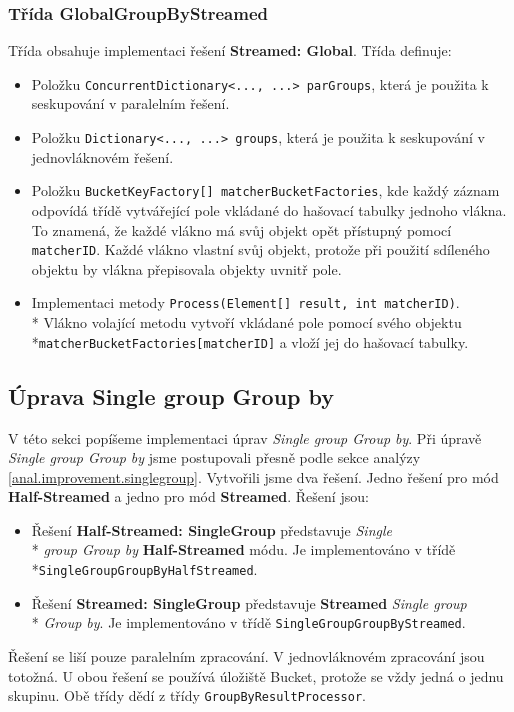 \subsubsection{Třída GlobalGroupByStreamed}

Třída obsahuje implementaci řešení \textbf{Streamed: Global}.
Třída definuje:
\begin{itemize}
\item Položku \texttt{ConcurrentDictionary<..., ...> parGroups}, která je použita k seskupování v paralelním řešení.
\item Položku \texttt{Dictionary<..., ...> groups}, která je použita k seskupování v jednovláknovém řešení.
\item Položku \texttt{BucketKeyFactory[] matcherBucketFactories}, kde každý záznam odpovídá třídě vytvářející pole vkládané do hašovací tabulky jednoho vlákna.
To znamená, že každé vlákno má svůj objekt opět přístupný pomocí \texttt{matcherID}.
Každé vlákno vlastní svůj objekt, protože při použití sdíleného objektu by vlákna přepisovala objekty uvnitř pole.
\item Implementaci metody \texttt{Process(Element[] result, int matcherID)}.\\*
Vlákno volající metodu vytvoří vkládané pole pomocí svého objektu \\*\texttt{matcherBucketFactories[matcherID]} a vloží jej do hašovací tabulky.
\end{itemize}

\subsection{Úprava Single group Group by}

V této sekci popíšeme implementaci úprav \textit{Single group Group by}.
Při úpravě \textit{Single group Group by} jsme postupovali přesně podle sekce analýzy \ref{anal.improvement.singlegroup}.
Vytvořili jsme dva řešení.
Jedno řešení pro mód \textbf{Half-Streamed} a jedno pro mód \textbf{Streamed}.
Řešení jsou:
\begin{itemize}
\item Řešení \textbf{Half-Streamed: SingleGroup} představuje \textit{Single}\\* \textit{group Group by} \textbf{Half-Streamed} módu.
Je implementováno v třídě \\*\texttt{SingleGroupGroupByHalfStreamed}.
\item Řešení \textbf{Streamed: SingleGroup} představuje \textbf{Streamed} \textit{Single group}\\* \textit{Group by}.
Je implementováno v třídě \texttt{SingleGroupGroupByStreamed}.
\end{itemize}
Řešení se liší pouze paralelním zpracování. 
V jednovláknovém zpracování jsou totožná.
U obou řešení se používá úložiště Bucket, protože se vždy jedná o jednu skupinu.
Obě třídy dědí z třídy \texttt{GroupByResultProcessor}.

